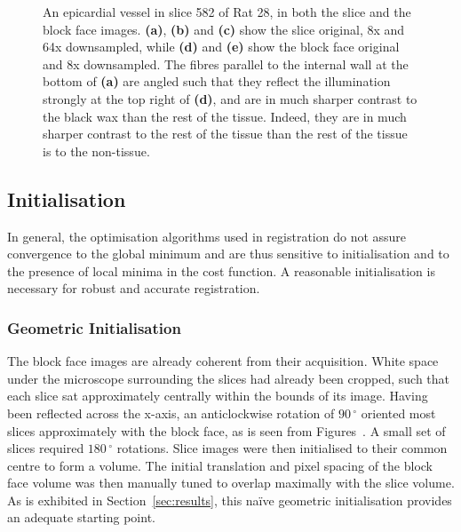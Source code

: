\begin{figure}
      \caption{An epicardial vessel in slice 582 of Rat 28, in both the slice and the block face images. \textbf{(a)}, \textbf{(b)} and \textbf{(c)} show the slice original, 8x and 64x downsampled, while \textbf{(d)} and \textbf{(e)} show the block face original and 8x downsampled. The fibres parallel to the internal wall at the bottom of \textbf{(a)} are angled such that they reflect the illumination strongly at the top right of \textbf{(d)}, and are in much sharper contrast to the black wax than the rest of the tissue. Indeed, they are in much sharper contrast to the rest of the tissue than the rest of the tissue is to the non-tissue.}
      \label{fig:downsample_zooms}
    \end{figure}
  
  \subsection{Initialisation} %
  \label{sub:initialisation}
    In general, the optimisation algorithms used in registration do not assure convergence to the global minimum and are thus sensitive to initialisation and to the presence of local minima in the cost function. A reasonable initialisation is necessary for robust and accurate registration.
	
		\subsubsection{Geometric Initialisation} %
		\label{ssub:geometric_initialisation}
			The block face images are already coherent from their acquisition. White space under the microscope surrounding the slices had already been cropped, such that each slice sat approximately centrally within the bounds of its image. Having been reflected across the x-axis, an anticlockwise rotation of $90\,^{\circ}$ oriented most slices approximately with the block face, as is seen from Figures~. A small set of slices required $180\,^{\circ}$ rotations. Slice images were then initialised to their common centre to form a volume. The initial translation and pixel spacing of the block face volume was then manually tuned to overlap maximally with the slice volume. As is exhibited in Section~\ref{sec:results}, this na\"ive geometric initialisation provides an adequate starting point.
	
